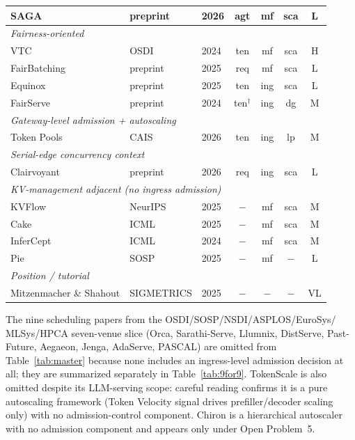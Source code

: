 \documentclass[11pt,letterpaper]{article}
\theoremstyle{definition}
\begin{document}
\begin{table}[htbp]
{\begin{tabular}{l l l c c c c}
SAGA                    & preprint   & 2026 & agt & mf  & sca  & L \\
\midrule
\multicolumn{7}{l}{\textit{Fairness-oriented}} \\
VTC                     & OSDI       & 2024 & ten & mf  & sca  & H \\
FairBatching            & preprint   & 2025 & req & mf  & sca  & L \\
Equinox                 & preprint   & 2025 & ten & ing & sca  & L \\
FairServe               & preprint   & 2024 & ten$^\dagger$ & ing & dg  & M \\
\midrule
\multicolumn{7}{l}{\textit{Gateway-level admission + autoscaling}} \\
Token Pools             & CAIS       & 2026 & ten & ing & lp   & M \\
\midrule
\multicolumn{7}{l}{\textit{Serial-edge concurrency context}} \\
Clairvoyant             & preprint   & 2026 & req & ing & sca  & L \\
\midrule
\multicolumn{7}{l}{\textit{KV-management adjacent (no ingress admission)}} \\
KVFlow                  & NeurIPS    & 2025 & $-$ & mf  & sca  & M \\
Cake                    & ICML       & 2025 & $-$ & mf  & sca  & M \\
InferCept               & ICML       & 2024 & $-$ & mf  & sca  & M \\
Pie                     & SOSP       & 2025 & $-$ & mf  & $-$  & L \\
\midrule
\multicolumn{7}{l}{\textit{Position / tutorial}} \\
Mitzenmacher \& Shahout & SIGMETRICS & 2025 & $-$ & $-$ & $-$  & VL \\
\bottomrule
\end{tabular}%
}
\end{table}

The nine scheduling papers from the OSDI/SOSP/NSDI/ASPLOS/EuroSys/
MLSys/HPCA seven-venue slice (Orca, Sarathi-Serve, Llumnix,
DistServe, Past-Future, Aegaeon, Jenga, AdaServe, PASCAL) are
omitted from Table~\ref{tab:master} because none includes an
ingress-level admission decision at all; they are summarized
separately in Table~\ref{tab:9for9}. TokenScale
\cite{lai2025tokenscale} is also omitted despite its LLM-serving
scope: careful reading confirms it is a pure autoscaling framework
(Token Velocity signal drives prefiller/decoder scaling only) with
no admission-control component. Chiron \cite{patke2025chiron} is a
hierarchical autoscaler with no admission component and appears
only under Open Problem~5.
\end{document}
